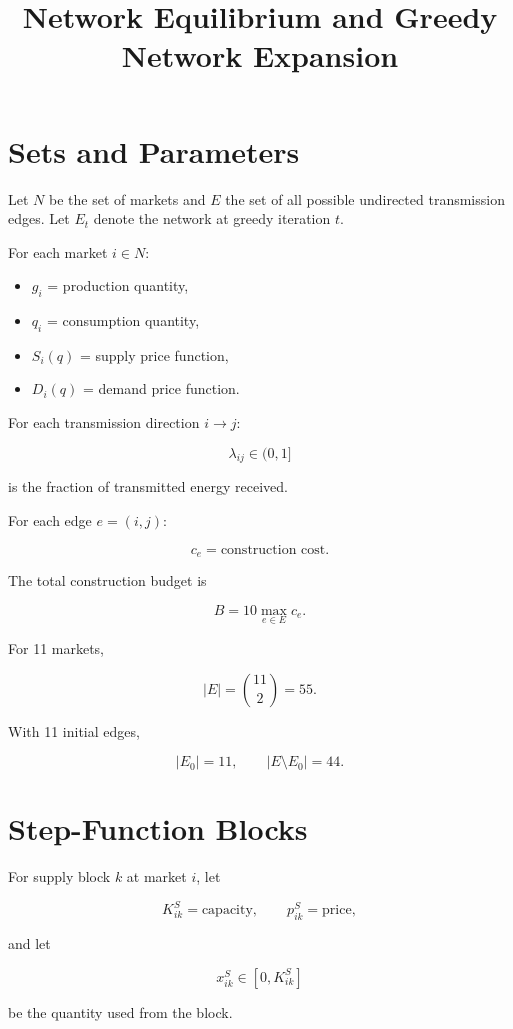 \documentclass[11pt]{article}
\title{Network Equilibrium and Greedy Network Expansion}
\author{}
\date{}
\begin{document}
\maketitle

\section{Sets and Parameters}

Let $N$ be the set of markets and $E$ the set of all possible undirected transmission edges.
Let $E_t$ denote the network at greedy iteration $t$.

For each market $i\in N$:

\begin{itemize}
    \item $g_i$ = production quantity,
    \item $q_i$ = consumption quantity,
    \item $S_i(q)$ = supply price function,
    \item $D_i(q)$ = demand price function.
\end{itemize}

For each transmission direction $i\rightarrow j$:

\[
\lambda_{ij}\in(0,1]
\]

is the fraction of transmitted energy received.

For each edge $e=(i,j)$:

\[
c_e = \text{construction cost}.
\]

The total construction budget is

\[
B = 10\max_{e\in E}c_e.
\]

For 11 markets,

\[
|E|=\binom{11}{2}=55.
\]

With 11 initial edges,

\[
|E_0|=11,\qquad |E\setminus E_0|=44.
\]

\section{Step-Function Blocks}

For supply block $k$ at market $i$, let

\[
K^S_{ik}=\text{capacity},\qquad
p^S_{ik}=\text{price},
\]

and let

\[
x^S_{ik}\in[0,K^S_{ik}]
\]

be the quantity used from the block.
\end{document}

